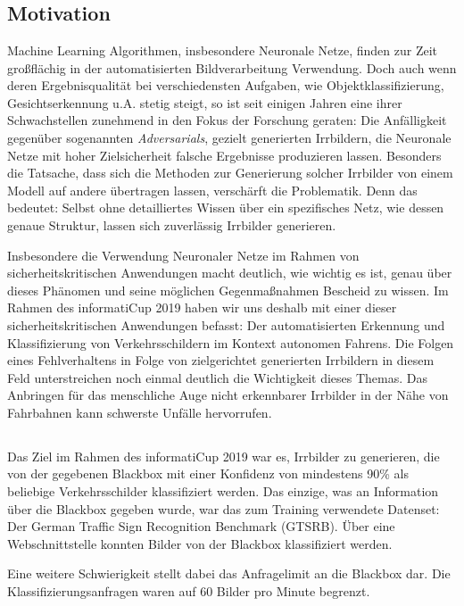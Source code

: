 \chapter{}
\label{cha:introduction}

\section{Motivation}

Machine Learning Algorithmen, insbesondere Neuronale Netze, finden zur Zeit großflächig in der automatisierten Bildverarbeitung Verwendung. 
Doch auch wenn deren Ergebnisqualität bei verschiedensten Aufgaben, wie Objektklassifizierung, Gesichtserkennung u.A. stetig steigt, so ist seit einigen Jahren
eine ihrer Schwachstellen zunehmend in den Fokus der Forschung geraten:
Die Anfälligkeit gegenüber sogenannten \textit{Adversarials}, gezielt generierten Irrbildern, die Neuronale Netze mit hoher Zielsicherheit falsche Ergebnisse produzieren lassen. Besonders die Tatsache, dass sich die Methoden zur Generierung solcher Irrbilder von einem Modell auf andere übertragen lassen, verschärft die Problematik. Denn das bedeutet: Selbst ohne detailliertes Wissen über ein spezifisches Netz, wie dessen genaue Struktur, lassen sich zuverlässig Irrbilder generieren.

Insbesondere die Verwendung Neuronaler Netze im Rahmen von sicherheitskritischen Anwendungen macht deutlich, wie wichtig es ist, genau über dieses Phänomen und seine möglichen Gegenmaßnahmen Bescheid zu wissen. Im Rahmen des informatiCup 2019 haben wir uns deshalb mit einer dieser sicherheitskritischen Anwendungen befasst: Der automatisierten Erkennung und Klassifizierung von Verkehrsschildern im Kontext autonomen Fahrens. 
Die Folgen eines Fehlverhaltens in Folge von zielgerichtet generierten Irrbildern in diesem Feld unterstreichen noch einmal deutlich die Wichtigkeit dieses Themas. Das Anbringen für das menschliche Auge nicht erkennbarer Irrbilder in der Nähe von Fahrbahnen kann schwerste Unfälle hervorrufen.   


\section{}

Das Ziel im Rahmen des informatiCup 2019 war es, Irrbilder zu generieren, die von der gegebenen Blackbox mit einer Konfidenz von mindestens 90\%
 als beliebige Verkehrsschilder klassifiziert werden. 
Das einzige, was an Information über die Blackbox gegeben wurde, war das zum Training verwendete Datenset: Der German Traffic Sign Recognition Benchmark (GTSRB).
Über eine Webschnittstelle konnten Bilder von der Blackbox klassifiziert werden. 

Eine weitere Schwierigkeit stellt dabei das Anfragelimit an die Blackbox dar. Die Klassifizierungsanfragen waren auf 60 Bilder pro Minute begrenzt. 
